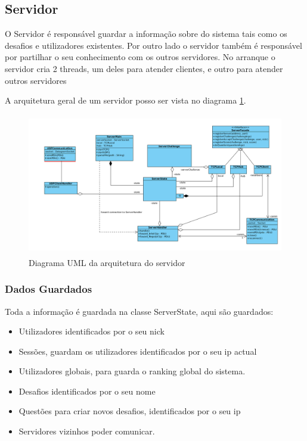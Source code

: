 \documentclass[runningheads,a4paper]{llncs}
\begin{document}
\subsection{Servidor}

O Servidor é responsável guardar a informação sobre do sistema tais como os desafios e utilizadores existentes. Por outro lado o servidor também é responsável por partilhar o seu conhecimento com os outros servidores.
No arranque o servidor cria 2 threads, um deles para atender clientes, e outro para atender outros  servidores 

A arquitetura geral de um servidor posso ser vista no diagrama \ref{fig:diagram-arq-geral}.

\begin{figure}
\centering
\includegraphics[height=6.2cm]{arq-geral.png}
\caption{Diagrama UML da arquitetura do servidor}
\label{fig:diagram-arq-geral}
\end{figure}


\subsubsection{Dados Guardados}

Toda a informação é guardada na classe ServerState, aqui são guardados:
\begin{itemize}
  \item Utilizadores identificados por o seu nick
  \item Sessões, guardam os utilizadores identificados por o seu ip actual
  \item Utilizadores globais, para guarda o ranking global do sistema.
  \item Desafios identificados por o seu nome
  \item Questões para criar novos desafios, identificados por o seu ip
  \item Servidores vizinhos poder comunicar.
\end{itemize}
\end{document}
